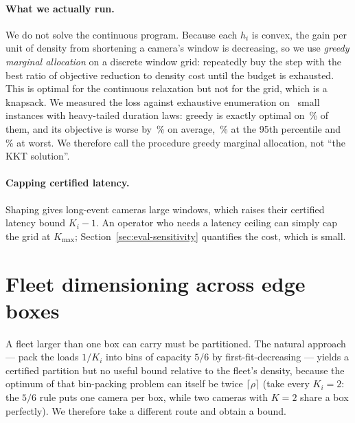 \documentclass[preprint,review,12pt]{elsarticle}
\theoremstyle{definition}
\newcommand{\Ki}{K_i}
\newcommand{\dens}{\rho}
\begin{document}
\paragraph{What we actually run.} We do not solve the continuous program. Because each $h_i$ is
convex, the gain per unit of density from shortening a camera's window is decreasing, so we use
\emph{greedy marginal allocation} on a discrete window grid: repeatedly buy the step with the best
ratio of objective reduction to density cost until the budget is exhausted. This is optimal for the
continuous relaxation but not for the grid, which is a knapsack. We measured the loss against
exhaustive enumeration on \numCsixTrials\ small instances with heavy-tailed duration laws: greedy
is exactly optimal on \numCsixOptFrac\,\% of them, and its objective is worse by
\numCsixGapMean\,\% on average, \numCsixGapPninefive\,\% at the 95th percentile and
\numCsixGapMax\,\% at worst. We therefore call the procedure greedy marginal allocation, not ``the
KKT solution''.

\paragraph{Capping certified latency.} Shaping gives long-event cameras large windows, which
raises their certified latency bound $\Ki-1$. An operator who needs a latency ceiling can simply
cap the grid at $K_{\max}$; Section~\ref{sec:eval-sensitivity} quantifies the cost, which is small.

\section{Fleet dimensioning across edge boxes}\label{sec:dimensioning}

A fleet larger than one box can carry must be partitioned. The natural approach --- pack the
loads $1/\Ki$ into bins of capacity $5/6$ by first-fit-decreasing --- yields a certified partition
but no useful bound relative to the fleet's density, because the optimum of that bin-packing
problem can itself be twice $\lceil\dens\rceil$ (take every $\Ki=2$: the $5/6$ rule puts one
camera per box, while two cameras with $K=2$ share a box perfectly). We therefore take a different
route and obtain a bound.
\end{document}
